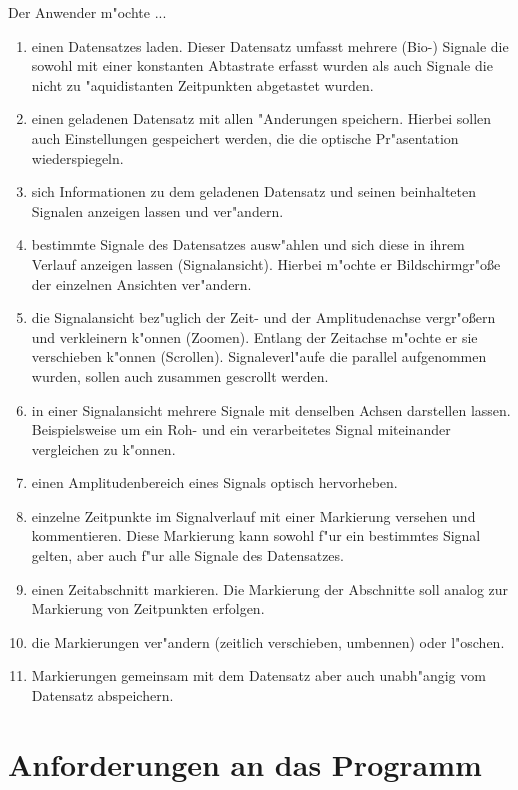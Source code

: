 \renewcommand{\theenumi}{\alph{enumi}}
\renewcommand{\labelenumi}{\theenumi )}
Der Anwender m"ochte ...
\begin{enumerate}
	\item einen Datensatzes laden.
		  Dieser Datensatz umfasst mehrere (Bio-) Signale die sowohl mit einer konstanten Abtastrate erfasst wurden als auch Signale die nicht zu "aquidistanten Zeitpunkten abgetastet wurden.
	\item einen geladenen Datensatz mit allen "Anderungen speichern.
		  Hierbei sollen auch Einstellungen gespeichert werden, die die optische Pr"asentation wiederspiegeln.
	\item sich Informationen zu dem geladenen Datensatz und seinen beinhalteten Signalen anzeigen lassen und ver"andern.
	\item bestimmte Signale des Datensatzes ausw"ahlen und sich diese in ihrem Verlauf anzeigen lassen (Signalansicht).
		  Hierbei m"ochte er Bildschirmgr"o\ss e der einzelnen Ansichten ver"andern.
	\item die Signalansicht bez"uglich der Zeit- und der Amplitudenachse vergr"o\ss ern und verkleinern k"onnen (Zoomen).
		  Entlang der Zeitachse m"ochte er sie verschieben k"onnen (Scrollen).
		  Signaleverl"aufe die parallel aufgenommen wurden, sollen auch zusammen gescrollt werden.
	\item in einer Signalansicht mehrere Signale mit denselben Achsen darstellen lassen.
		  Beispielsweise um ein Roh- und ein verarbeitetes Signal miteinander vergleichen zu k"onnen.
	\item einen Amplitudenbereich eines Signals optisch hervorheben.
	\item einzelne Zeitpunkte im Signalverlauf mit einer Markierung versehen und kommentieren.
		  Diese Markierung kann sowohl f"ur ein bestimmtes Signal gelten, aber auch f"ur alle Signale des Datensatzes.
	\item einen Zeitabschnitt markieren. Die Markierung der Abschnitte soll analog zur Markierung von Zeitpunkten erfolgen.
	\item die Markierungen ver"andern (zeitlich verschieben, umbennen) oder l"oschen.
	\item Markierungen gemeinsam mit dem Datensatz aber auch unabh"angig vom Datensatz abspeichern.
\end{enumerate}

\section{Anforderungen an das Programm}
\label{chap:anforderungen}

